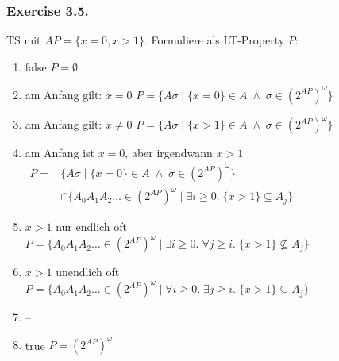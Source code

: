 \documentclass{beamer}
\begin{document}
\begin{frame}
    \frametitle{Exercise 3.5.}
    TS mit $AP = \{x=0, x>1\}$.  Formuliere als LT-Property $P$:
    \begin{enumerate}[<+->]
        \renewcommand{\theenumi}{\alph{enumi}}
        \item \alert{false} \quad
                $P = \emptyset$
        \item \alert{am Anfang gilt: $x=0$} \quad
                $P = \big\{ A\sigma \; | \; \{x=0\} \in A \; \land \; \sigma \in (2^{AP})^\omega \big\}$
        \item \alert{am Anfang gilt: $x\neq 0$} \quad
                $P = \big\{ A\sigma \; | \; \{x>1\} \in A \; \land \; \sigma \in (2^{AP})^\omega \big\}$
        \item \alert{am Anfang ist $x=0$, aber irgendwann $x>1$} \quad \\
                $\begin{aligned}
                        P = &\big\{ A\sigma \; | \; \{x=0\} \in A \; \land \; \sigma \in (2^{AP})^\omega \big\} \\
                        &\cap \big\{ A_0 A_1 A_2 \dots \in (2^{AP})^\omega \; | \;
                                \exists i\geq 0.\; \{x>1\}\subseteq A_j\big\}
                        \end{aligned}$
        \item \alert{$x>1$ nur endlich oft} \quad
                $P = \big\{ A_0 A_1 A_2 \dots \in (2^{AP})^\omega \; | \;
                \exists i\geq 0.\; \forall j \geq i.\; \{x>1\}\not\subseteq A_j \big\}$
        \item \alert{$x>1$ unendlich oft} \quad
                $P = \big\{ A_0 A_1 A_2 \dots \in (2^{AP})^\omega \; | \;
                \forall i\geq 0.\; \exists j \geq i.\; \{x>1\}\subseteq A_j \big\}$
        \item --
        \item \alert{true} \quad
                $P = (2^{AP})^\omega$
    \end{enumerate}
\end{frame}
\end{document}
